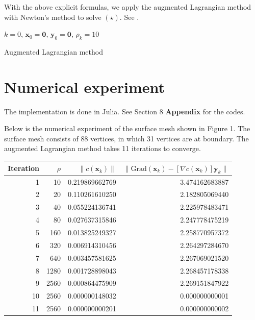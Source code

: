 \documentclass{article} %
\begin{document}
With the above explicit formulas, we apply the augmented Lagrangian method with Newton's method to solve $(\star)$. See .

\begin{algorithm}[H]
 $k = 0$, $\mathbf{x}_0 = \mathbf{0}$, $\mathbf{y}_0 = \mathbf{0}$, $\rho_k = 10$ \;
 \caption{Augmented Lagrangian method}
\end{algorithm}

\section{Numerical experiment}

The implementation is done in Julia. See Section 8 \textbf{Appendix} for the codes.

Below is the numerical experiment of the surface mesh shown in Figure 1. The surface mesh consists of 88 vertices, in which 31 vertices are at boundary. The augmented Lagrangian method takes 11 iterations to converge.

\begin{center}
\begin{tabular}{ |r|r|r|r| } 
 \hline
 Iteration & $\rho$ & $\| c(\mathbf{x}_k) \|$ & $\| \text{Grad}(\mathbf{x}_k) - [\nabla c (\mathbf{x}_k)] \mathbf{y}_k \|$ \\
 \hline
     1 &    10 &    0.219869662769 &    3.474162683887 \\
     2 &    20 &    0.110261610250 &    2.182805069440 \\
     3 &    40 &    0.055224136741 &    2.225978483471 \\
     4 &    80 &    0.027637315846 &    2.247778475219 \\
     5 &   160 &    0.013825249327 &    2.258770957372 \\
     6 &   320 &    0.006914310456 &    2.264297284670 \\
     7 &   640 &    0.003457581625 &    2.267069021520 \\
     8 &  1280 &    0.001728898043 &    2.268457178338 \\
     9 &  2560 &    0.000864475909 &    2.269151847922 \\
    10 &  2560 &    0.000000148032 &    0.000000000001 \\
    11 &  2560 &    0.000000000201 &    0.000000000002 \\
 \hline
\end{tabular}
\end{center}
\end{document}
